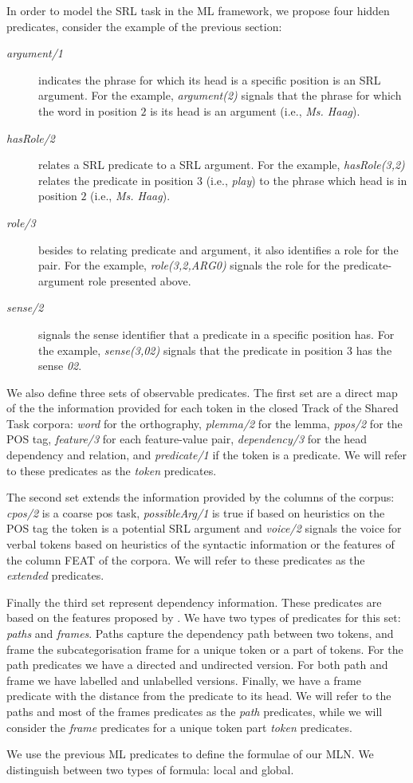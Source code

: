 
In order to model the SRL task in the ML framework, we propose four hidden 
predicates, consider the example of the previous section:
\begin{description}
    \item [\emph{argument/1}] indicates the phrase for which its head is a 
        specific position is an SRL argument. For the example,     
        \emph{argument(2)} signals that the phrase for which the word in 
        position $2$ is its head is an argument (i.e., \emph{Ms. Haag}).
    \item [\emph{hasRole/2}] relates a SRL predicate to a SRL argument. For the 
        example, \emph{hasRole(3,2)} relates the
        predicate in position $3$ (i.e., \emph{play}) to the phrase which head 
        is in position $2$ (i.e., \emph{Ms. Haag}).
    \item [\emph{role/3}] besides to relating predicate and argument, it also
        identifies a role for the pair. For the example,
        \emph{role(3,2,ARG0)} signals the role for the predicate-argument role 
        presented above.
    \item [\emph{sense/2}] signals the sense identifier that a predicate in a
        specific position has. For the example, \emph{sense(3,02)}
        signals that the predicate in position $3$ has the sense \emph{02}.
\end{description}

We also define three sets of observable predicates. The first set are a direct 
map of the the information provided for each token in the closed Track of the 
Shared Task corpora:  \emph{word} for the orthography, \emph{plemma/2} for the 
lemma, \emph{ppos/2} for the POS tag, \emph{feature/3} for each feature-value 
pair, \emph{dependency/3} for the head dependency and relation, and 
\emph{predicate/1} if the token is a predicate. We will refer to these 
predicates as the \emph{token} predicates.

The second set extends the information provided by the columns of the corpus: 
\emph{cpos/2} is a coarse pos task, \emph{possibleArg/1} is true if based 
on heuristics on the POS tag the token is a potential SRL argument and 
\emph{voice/2} signals the voice for verbal tokens based on heuristics of the 
syntactic information or the features of the column FEAT of the corpora. We will 
refer to these predicates as the \emph{extended} predicates.

Finally the third set represent dependency information. These predicates are 
based on the features proposed by \citet{xue04calibrating}. We have two types of 
predicates for this set: \emph{paths} and \emph{frames}.  Paths capture the 
dependency path between two tokens, and frame the subcategorisation frame for a 
unique token or a part of tokens. For the path predicates we have a directed and 
undirected version. For both path and frame we have labelled and unlabelled 
versions.  Finally, we have a frame predicate with the distance from the 
predicate to its head.  We will refer to the paths and most of the frames 
predicates as the \emph{path} predicates, while we will consider the 
\emph{frame} predicates for a unique token part \emph{token} predicates.

We use the previous ML predicates to define the formulae of our MLN.  We 
distinguish between two types of formula: local and global. 
